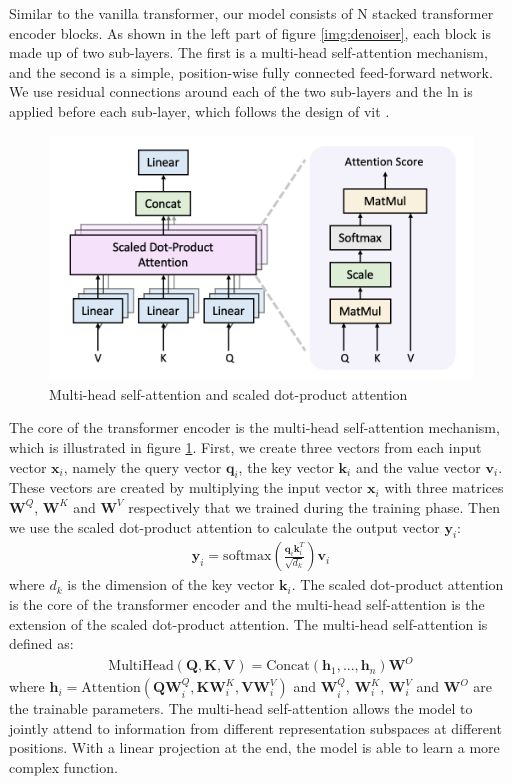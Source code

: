 \documentclass[12pt,DIV14,BCOR12mm,a4paper,footinclude=false,headinclude,parskip=half-,twoside,openright,cleardoublepage=empty,toc=index,bibliography=totoc,listof=totoc]{scrreprt}
\numberwithin{equation}{chapter}
\begin{document}
Similar to the vanilla transformer, our model consists of N stacked transformer encoder blocks. As shown in the left part of figure \ref{img:denoiser}, each block is made up of two sub-layers. The first is a multi-head self-attention mechanism, and the second is a simple, position-wise fully connected feed-forward network. We use residual connections around each of the two sub-layers and the \gls{ln} is applied before each sub-layer, which follows the design of \gls{vit} \cite{dosovitskiy2021image}.
\begin{figure}[h]
	\centering
	\includegraphics[scale=.30]{img/mhsa.png}
	\caption{Multi-head self-attention and scaled dot-product attention}
	\label{img:mhsa}
\end{figure}

The core of the transformer encoder is the multi-head self-attention mechanism, which is illustrated in figure \ref{img:mhsa}. First, we create three vectors from each input vector $\mathbf{x}_{i}$, namely the query vector $\mathbf{q}_{i}$, the key vector $\mathbf{k}_{i}$ and the value vector $\mathbf{v}_{i}$. These vectors are created by multiplying the input vector $\mathbf{x}_{i}$ with three matrices $\mathbf{W}^{Q}$, $\mathbf{W}^{K}$ and $\mathbf{W}^{V}$ respectively that we trained during the training phase. Then we use the scaled dot-product attention to calculate the output vector $\mathbf{y}_{i}$:
\begin{align}
  \mathbf{y}_{i} = \text{softmax}\left(\frac{\mathbf{q}_{i}\mathbf{k}_{i}^{T}}{\sqrt{d_{k}}}\right)\mathbf{v}_{i}
\end{align}
where $d_{k}$ is the dimension of the key vector $\mathbf{k}_{i}$. The scaled dot-product attention is the core of the transformer encoder and the multi-head self-attention is the extension of the scaled dot-product attention. The multi-head self-attention is defined as:
\begin{align}
  \text{MultiHead}(\mathbf{Q}, \mathbf{K}, \mathbf{V}) = \text{Concat}(\mathbf{h}_{1},...,\mathbf{h}_{n})\mathbf{W}^{O}
\end{align}
where $\mathbf{h}_{i} = \text{Attention}(\mathbf{Q}\mathbf{W}_{i}^{Q}, \mathbf{K}\mathbf{W}_{i}^{K}, \mathbf{V}\mathbf{W}_{i}^{V})$ and $\mathbf{W}_{i}^{Q}$, $\mathbf{W}_{i}^{K}$, $\mathbf{W}_{i}^{V}$ and $\mathbf{W}^{O}$ are the trainable parameters. The multi-head self-attention allows the model to jointly attend to information from different representation subspaces at different positions. With a linear projection at the end, the model is able to learn a more complex function.
\end{document}
